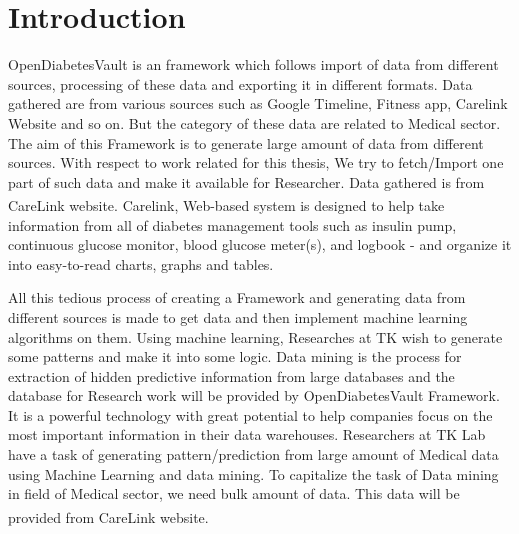 \documentclass[article,type=msc,colorback,accentcolor=tud9c,twoside,11pt]{tudthesis}
\begin{document}
\clearpage
\tableofcontents 
\clearpage
\listoffigures
\clearpage
\listoftables
{}

\clearpage
{}
\section{Introduction}
OpenDiabetesVault is an framework which follows import of data from different sources, processing of these data and exporting it in different formats. Data gathered are from various sources such as Google Timeline, Fitness app, Carelink Website and so on. But the category of these data are related to Medical sector. The aim of this Framework is to generate large amount of data from different sources. With respect to work related for this thesis, We try to fetch/Import one part of such data and make it available for Researcher. Data gathered is from CareLink\textsuperscript{\textregistered} website. Carelink, Web-based system is designed to help take information from all of diabetes management tools such as insulin pump, continuous glucose monitor, blood glucose meter(s), and logbook - and organize it into easy-to-read charts, graphs and tables.

All this tedious process of creating a Framework and generating data from different sources is made to get data and then implement machine learning algorithms on them. Using machine learning, Researches at TK wish to generate some patterns and make it into some logic. Data mining is the process for extraction of hidden predictive information from large databases and the database for Research work will be provided by OpenDiabetesVault Framework. It is a powerful technology with great potential to help companies focus on the most important information in their data warehouses. Researchers at TK Lab have a task of generating pattern/prediction from large amount of Medical data using Machine Learning and data mining. To capitalize the task of Data mining in field of Medical sector, we need bulk amount of data. This data will be provided from CareLink\textsuperscript{\textregistered} website. 
\end{document}
